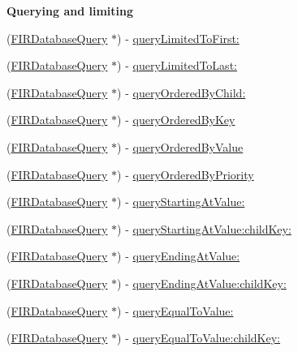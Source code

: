 \begin{Indent}{\bf Querying and limiting}\par
\begin{DoxyCompactItemize}
\item 
(\hyperlink{interface_f_i_r_database_query}{F\+I\+R\+Database\+Query} $\ast$) -\/ \hyperlink{interface_f_i_r_database_query_aaf2bd589708a3753b605d99176099dfa}{query\+Limited\+To\+First\+:}
\item 
(\hyperlink{interface_f_i_r_database_query}{F\+I\+R\+Database\+Query} $\ast$) -\/ \hyperlink{interface_f_i_r_database_query_a1b3e5a178d43ef71b85cd8e46838b81d}{query\+Limited\+To\+Last\+:}
\item 
(\hyperlink{interface_f_i_r_database_query}{F\+I\+R\+Database\+Query} $\ast$) -\/ \hyperlink{interface_f_i_r_database_query_a5d089e583013c7cdcd653f974e2cba56}{query\+Ordered\+By\+Child\+:}
\item 
(\hyperlink{interface_f_i_r_database_query}{F\+I\+R\+Database\+Query} $\ast$) -\/ \hyperlink{interface_f_i_r_database_query_ad77840264e0c925ed3045cb3f9dc08b9}{query\+Ordered\+By\+Key}
\item 
(\hyperlink{interface_f_i_r_database_query}{F\+I\+R\+Database\+Query} $\ast$) -\/ \hyperlink{interface_f_i_r_database_query_a0e8cfe18720932f0c016c5b002518d85}{query\+Ordered\+By\+Value}
\item 
(\hyperlink{interface_f_i_r_database_query}{F\+I\+R\+Database\+Query} $\ast$) -\/ \hyperlink{interface_f_i_r_database_query_a39a48a5a1634f3bcb7b9fc877de21358}{query\+Ordered\+By\+Priority}
\item 
(\hyperlink{interface_f_i_r_database_query}{F\+I\+R\+Database\+Query} $\ast$) -\/ \hyperlink{interface_f_i_r_database_query_a43da151946ea4ba98dbe3053cb2692d3}{query\+Starting\+At\+Value\+:}
\item 
(\hyperlink{interface_f_i_r_database_query}{F\+I\+R\+Database\+Query} $\ast$) -\/ \hyperlink{interface_f_i_r_database_query_a73645c8c244cb9aedd6c9d05b16ebf54}{query\+Starting\+At\+Value\+:child\+Key\+:}
\item 
(\hyperlink{interface_f_i_r_database_query}{F\+I\+R\+Database\+Query} $\ast$) -\/ \hyperlink{interface_f_i_r_database_query_ab8e9beccc9d62fdeb38b43f6874b4d5b}{query\+Ending\+At\+Value\+:}
\item 
(\hyperlink{interface_f_i_r_database_query}{F\+I\+R\+Database\+Query} $\ast$) -\/ \hyperlink{interface_f_i_r_database_query_a0fbc07c9e88066cc91b9f4a92e380de5}{query\+Ending\+At\+Value\+:child\+Key\+:}
\item 
(\hyperlink{interface_f_i_r_database_query}{F\+I\+R\+Database\+Query} $\ast$) -\/ \hyperlink{interface_f_i_r_database_query_a976e08ccfcdd4290900eaf6010d09b2d}{query\+Equal\+To\+Value\+:}
\item 
(\hyperlink{interface_f_i_r_database_query}{F\+I\+R\+Database\+Query} $\ast$) -\/ \hyperlink{interface_f_i_r_database_query_a157a0049e37c32f5da5a4d1d09f212e3}{query\+Equal\+To\+Value\+:child\+Key\+:}
\end{DoxyCompactItemize}
\end{Indent}
